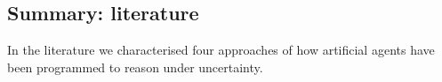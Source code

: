 % 

\subsection{Summary: literature}

In the literature we characterised four approaches of how artificial agents have been programmed to reason under uncertainty. 


